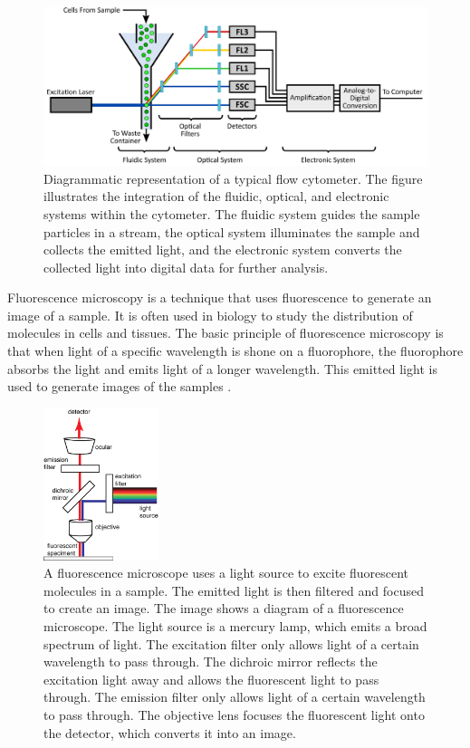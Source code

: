 \documentclass[12pt,a4paper]{article}
\begin{document}
\begin{figure}
  \centering
  \includegraphics[width=\textwidth]{Figures/flow-cytometer.png}
  \caption{Diagrammatic representation of a typical flow cytometer. The figure illustrates the integration of the fluidic, optical, and electronic systems within the cytometer. The fluidic system guides the sample particles in a stream, the optical system illuminates the sample and collects the emitted light, and the electronic system converts the collected light into digital data for further analysis. \cite{aatbioFundamentalsFlow}}
  \label{flowcytometry}
\end{figure}

Fluorescence microscopy is a technique that uses fluorescence to generate an image of a sample. It is often used in biology to study the distribution of molecules in cells and tissues. The basic principle of fluorescence microscopy is that when light of a specific wavelength is shone on a fluorophore, the fluorophore absorbs the light and emits light of a longer wavelength. This emitted light is used to generate images of the samples \cite{sanderson_smith_parker_bootman_2014}.

\begin{figure}
  \centering
  \includegraphics[width=0.3\textwidth]{Figures/454px-Fluorescence_Microscopy_01.png}
  \caption{A fluorescence microscope uses a light source to excite fluorescent molecules in a sample. The emitted light is then filtered and focused to create an image. The image shows a diagram of a fluorescence microscope. The light source is a mercury lamp, which emits a broad spectrum of light. The excitation filter only allows light of a certain wavelength to pass through. The dichroic mirror reflects the excitation light away and allows the fluorescent light to pass through. The emission filter only allows light of a certain wavelength to pass through. The objective lens focuses the fluorescent light onto the detector, which converts it into an image. \cite{File:Fluorescence Microscopy 01.png - Biology Wiki}}
  \label{fluorescencemicroscopy}
\end{figure}
\end{document}
